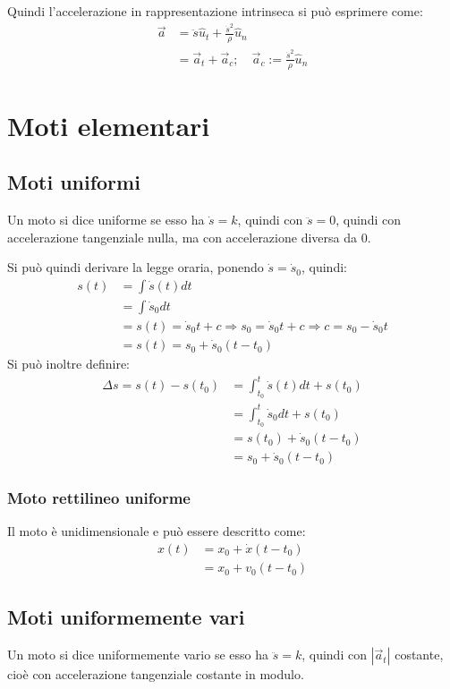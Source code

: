 \documentclass[11pt, a4paper, openright]{book}
\theoremstyle{plain}
\theoremstyle{definition}
\begin{document}
Quindi l'accelerazione in rappresentazione intrinseca si può esprimere come:
\begin{align}
    \vec{a} & = \ddot{s}\hat{u}_t + \frac{\dot{s}^2}{\rho}\hat{u}_n \\
    & = \vec{a}_t + \vec{a}_c; \quad \vec{a}_c := \frac{\dot{s}^2}{\rho}\hat{u}_n
\end{align}

\newpage
\section{Moti elementari}
\subsection{Moti uniformi}
Un moto si dice uniforme se esso ha $\dot{s} = k$, quindi con $\ddot{s} = 0$, quindi con accelerazione tangenziale nulla, ma con accelerazione diversa da 0.

Si può quindi derivare la legge oraria, ponendo $\dot{s} = \dot{s}_0$, quindi:
\begin{align}
    s(t) & = \int \dot{s}(t)dt \\
    & = \int \dot{s}_0dt \\ 
    & = s(t) = \dot{s}_0t + c \Rightarrow s_0 = \dot{s}_0t + c \Rightarrow c = s_0 - \dot{s}_0t \\
    & = s(t) = s_0 + \dot{s}_0(t - t_0)
\end{align}
Si può inoltre definire:
\begin{align}
    \Delta s = s(t) - s(t_0) & = \int_{t_0}^{t} \dot{s}(t)dt + s(t_0)\\
    & = \int_{t_0}^{t} \dot{s}_0dt + s(t_0) \\
    & =  s(t_0) + \dot{s}_0(t - t_0) \\
    & = s_0 + \dot{s}_0(t - t_0)
\end{align}
    
\subsubsection{Moto rettilineo uniforme}
Il moto è unidimensionale e può essere descritto come:
\begin{align}
    x(t) & = x_0 + \dot{x}(t - t_0) \\
    & = x_0 + v_0(t - t_0)
\end{align}


\subsection{Moti uniformemente vari}
Un moto si dice uniformemente vario se esso ha $\ddot{s} = k$, quindi con $|\vec{a}_t|$ costante, cioè con accelerazione tangenziale costante in modulo.
\end{document}
